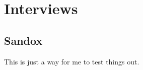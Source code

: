 \chapter{Interviews}\label{ch00:Sandbox}

\section{Sandox}

This is just a way for me to test things out.